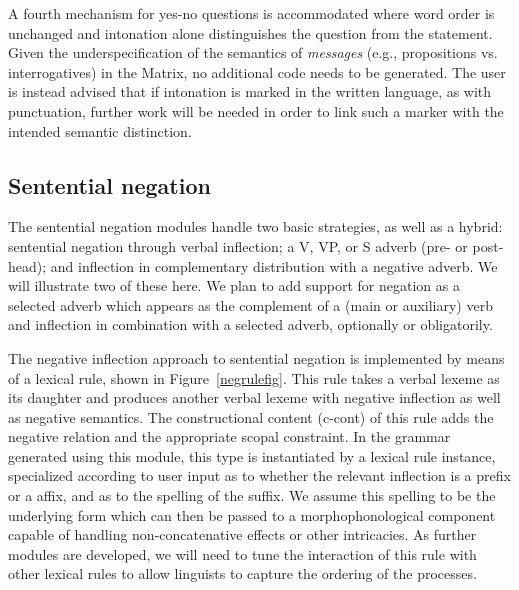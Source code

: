A fourth mechanism for yes-no questions is accommodated where word order is
unchanged and intonation alone distinguishes the question from the statement.
Given the underspecification of the semantics of {\it messages} (e.g.,
propositions vs. interrogatives) in the Matrix, no additional code needs to
be generated.  The user is instead advised that if intonation is marked in 
the written language, as with punctuation, further work will be needed in order
to link such a marker with the intended semantic distinction.

\subsection{Sentential negation}

The sentential negation modules handle two basic strategies, as well
as a hybrid: sentential negation through verbal inflection; a V,
VP, or S adverb (pre- or post-head); and inflection in complementary
distribution with a negative adverb. We will illustrate two of these
here.  We plan to add support for negation as a
selected adverb which appears as the complement of a (main or auxiliary) verb 
and inflection in combination with a selected adverb,
optionally or obligatorily.

The negative inflection approach to sentential negation is implemented
by means of a lexical rule, shown in Figure~\ref{negrulefig}.  This
rule takes a verbal lexeme as its daughter and produces another verbal
lexeme with negative inflection as well as negative semantics.  The
constructional content ({\sc c-cont}) of this rule adds the negative
relation and the appropriate scopal constraint.
In the grammar generated using this module,
this type is instantiated by a lexical rule instance, specialized
according to user input as to whether the relevant inflection is a
prefix or a affix, and as to the spelling of the suffix.  We assume
this spelling to be the underlying form which can then be passed to a
morphophonological component capable of handling non-concatenative
effects or other intricacies.  As further modules are developed, we
will need to tune the interaction of this rule with other lexical
rules to allow linguists to capture the ordering of the
processes.

